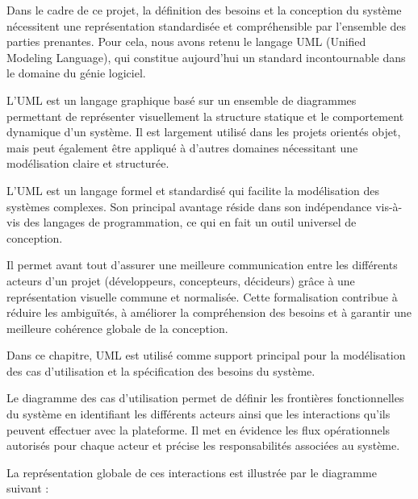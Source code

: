 
Dans le cadre de ce projet, la définition des besoins et la conception du système nécessitent une représentation standardisée et compréhensible par l’ensemble des parties prenantes. Pour cela, nous avons retenu le langage UML (Unified Modeling Language), qui constitue aujourd’hui un standard incontournable dans le domaine du génie logiciel.

L’UML est un langage graphique basé sur un ensemble de diagrammes permettant de représenter visuellement la structure statique et le comportement dynamique d’un système. Il est largement utilisé dans les projets orientés objet, mais peut également être appliqué à d’autres domaines nécessitant une modélisation claire et structurée.


L’UML est un langage formel et standardisé qui facilite la modélisation des systèmes complexes. Son principal avantage réside dans son indépendance vis-à-vis des langages de programmation, ce qui en fait un outil universel de conception.

Il permet avant tout d’assurer une meilleure communication entre les différents acteurs d’un projet (développeurs, concepteurs, décideurs) grâce à une représentation visuelle commune et normalisée. Cette formalisation contribue à réduire les ambiguïtés, à améliorer la compréhension des besoins et à garantir une meilleure cohérence globale de la conception.

Dans ce chapitre, UML est utilisé comme support principal pour la modélisation des cas d’utilisation et la spécification des besoins du système.




Le diagramme des cas d'utilisation permet de définir les frontières fonctionnelles du système en identifiant les différents acteurs ainsi que les interactions qu’ils peuvent effectuer avec la plateforme. Il met en évidence les flux opérationnels autorisés pour chaque acteur et précise les responsabilités associées au système.

La représentation globale de ces interactions est illustrée par le diagramme suivant :



